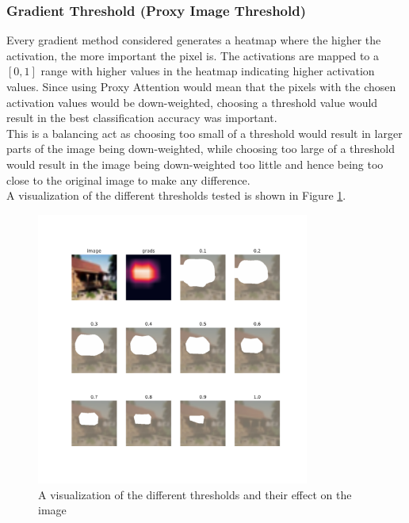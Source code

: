 \subsubsection{Gradient Threshold (Proxy Image Threshold)}
Every gradient method considered generates a heatmap where the higher the activation, the more important the pixel is. The activations are mapped to a $[0,1]$ range with higher values in the heatmap indicating higher activation values. Since using Proxy Attention would mean that the pixels with the chosen activation values would be down-weighted, choosing a threshold value would result in the best classification accuracy was important.\\
This is a balancing act as choosing too small of a threshold would result in larger parts of the image being down-weighted, while choosing too large of a threshold would result in the image being down-weighted too little and hence being too close to the original image to make any difference.\\
A visualization of the different thresholds tested is shown in Figure \ref{fig:thresholds}.

\begin{figure}[H]
    \centering
    \includegraphics[width=0.8\textwidth]{images/grad_threshold.pdf}
    \caption{A visualization of the different thresholds and their effect on the image}
    \label{fig:thresholds}
\end{figure}

